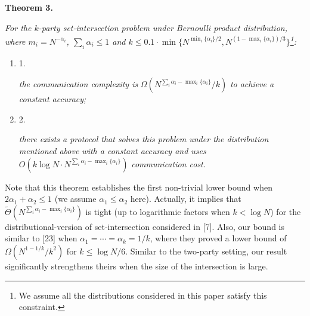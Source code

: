 \documentclass[10pt,a4paper]{article}
\begin{document}
\par\medskip\noindent\textbf{
\textbf{Theorem 3}\textbf{.}
}\par



\emph{For the $k$-party set-intersection problem under Bernoulli product distribution, where $m_{i}=N^{-\alpha_{i}}$, $\sum_{i}\alpha_{i}\leq 1$ and $k\leq 0.1\cdot\min\{N^{\min_{i}\{\alpha_{i}\}/2},N^{(1-\max_{i}\{\alpha_{i}\})/3}\}$\footnote{We assume all the distributions considered in this paper satisfy this constraint.}:}\par


\begin{enumerate}


\item[] 
1. 


\emph{the communication complexity is }$\Omega\left(N^{\sum_{i}\alpha_{i}-\mathop{\max}_{i}\{\alpha_{i}\}}/k\right)$\emph{ to achieve a constant accuracy;}\par





\item[] 
2. 


\emph{there exists a protocol that solves this problem under the distribution mentioned above with a constant accuracy and uses }$O\left(k\log N\cdot N^{\sum_{i}\alpha_{i}-\mathop{\max}_{i}\{\alpha_{i}\}}\right)$\emph{ communication cost.}\par





\end{enumerate}







Note that this theorem establishes the first non-trivial lower bound when $2\alpha_{1}+\alpha_{2}\leq 1$ (we assume $\alpha_{1}\leq\alpha_{2}$ here). Actually, it implies that $\widetilde{\Theta}\left(N^{\sum_{i}\alpha_{i}-\mathop{\max}_{i}\{\alpha_{i}\}}\right)$ is tight (up to logarithmic factors when $k<\log N$) for the distributional-version of set-intersection considered in [7]. Also, our bound is similar to [23] when $\alpha_{1}=\cdots=\alpha_{k}=1/k$, where they proved a lower bound of $\Omega(N^{1-1/k}/k^{2})$ for $k\leq\log N/6.$ Similar to the two-party setting, our result significantly strengthens theirs when the size of the intersection is large.\par
\end{document}
